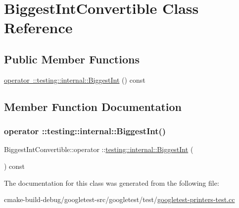 \hypertarget{classBiggestIntConvertible}{}\section{Biggest\+Int\+Convertible Class Reference}
\label{classBiggestIntConvertible}
\subsection*{Public Member Functions}
\begin{DoxyCompactItemize}
\item 
\mbox{\hyperlink{classBiggestIntConvertible_a080f0dcdd3feff9a45be79492530129a}{operator \+::testing\+::internal\+::\+Biggest\+Int}} () const
\end{DoxyCompactItemize}


\subsection{Member Function Documentation}
\mbox{\label{classBiggestIntConvertible_a080f0dcdd3feff9a45be79492530129a}} 
\subsubsection{\texorpdfstring{operator ::testing::internal::BiggestInt()}{operator ::testing::internal::BiggestInt()}}
{\footnotesize\ttfamily Biggest\+Int\+Convertible\+::operator \+::\mbox{\hyperlink{namespacetesting_1_1internal_a05c6bd9ede5ccdf25191a590d610dcc6}{testing\+::internal\+::\+Biggest\+Int}} (\begin{DoxyParamCaption}{ }\end{DoxyParamCaption}) const\hspace{0.3cm}{\ttfamily [inline]}}



The documentation for this class was generated from the following file\+:\begin{DoxyCompactItemize}
\item 
cmake-\/build-\/debug/googletest-\/src/googletest/test/\mbox{\hyperlink{googletest-printers-test_8cc}{googletest-\/printers-\/test.\+cc}}\end{DoxyCompactItemize}
